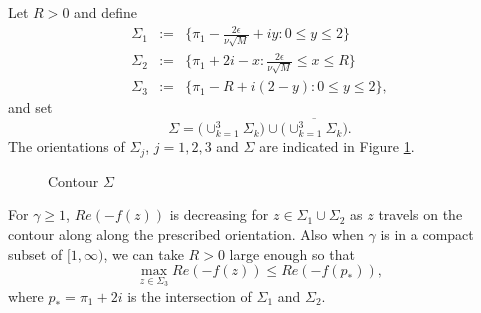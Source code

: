\documentclass[11pt]{article}
\begin{document}
Let $R>0$ and define
\begin{eqnarray}
  \Sigma_1 &:=& \{ \pi_1-\frac{2\epsilon}{\nu\sqrt{M}}+iy : 0\le y\le 2  \} \\
  \Sigma_2 &:=& \{ \pi_1+2i -x : \frac{2\epsilon}{\nu\sqrt{M}}\le x\le R\} \\
  \Sigma_3 &:=& \{ \pi_1-R+i(2-y) : 0\le y\le 2 \},
\end{eqnarray}
and set
\begin{equation}
  \Sigma= \bigl( \cup_{k=1}^3 \Sigma_k \bigr)
\cup \overline{\bigl( \cup_{k=1}^3 \Sigma_k \bigr)}.
\end{equation}
The orientations of $\Sigma_j$, $j=1,2,3$ and $\Sigma$ are
indicated in Figure \ref{fig:Steep3}.
\begin{figure}[ht]
\centerline{\epsfxsize=11cm} \caption{Contour
$\Sigma$}\label{fig:Steep3}
\end{figure}

\begin{lemma}\label{lem:GaussJ}
For $\gamma\ge 1$, $Re(-f(z))$ is decreasing for $z\in \Sigma_1\cup\Sigma_2$
as $z$ travels on the contour along along
the prescribed orientation.
Also when $\gamma$ is in a compact subset of $[1,\infty)$, we can take $R>0$ large enough
so that
\begin{equation}\label{eq:bdS3}
  \max_{z\in\Sigma_3} Re(-f(z)) \le Re (-f(p_*)),
\end{equation}
where $p_*=\pi_1+2i$ is the intersection of $\Sigma_1$ and
$\Sigma_2$.
\end{lemma}
\end{document}
